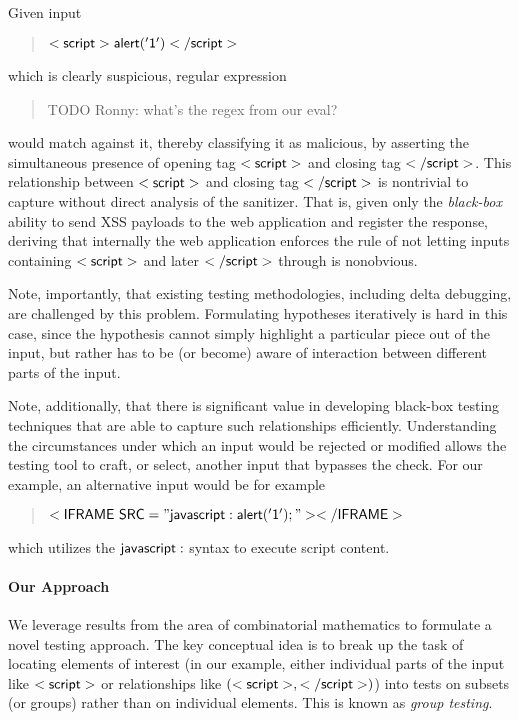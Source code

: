 Given input 
\begin{quote}
$\sf{<script>alert('1')</script>}$
\end{quote}
which is clearly suspicious, regular expression
\begin{quote}
	TODO Ronny: what's the regex from our eval?
\end{quote}
would match against it, thereby classifying it as malicious, by asserting the simultaneous presence of opening tag ${\sf <script>}$ and closing tag ${\sf </script>}$. This relationship between ${\sf <script>}$ and closing tag ${\sf </script>}$ is nontrivial to capture without direct analysis of the sanitizer. That is, given only the \emph{black-box} ability to send XSS payloads to the web application and register the response, deriving that internally the web application enforces the rule of not letting inputs containing ${\sf <script>}$ and later ${\sf </script>}$ through is nonobvious.

Note, importantly, that existing testing methodologies, including delta debugging, are challenged by this problem. Formulating hypotheses iteratively is hard in this case, since the hypothesis cannot simply highlight a particular piece out of the input, but rather has to be (or become) aware of interaction between different parts of the input.

Note, additionally, that there is significant value in developing black-box testing techniques that are able to capture such relationships efficiently. Understanding the circumstances under which an input would be rejected or modified allows the testing tool to craft, or select, another input that bypasses the check. For our example, an alternative input would be for example
\begin{quote}
	${\sf <IFRAME~SRC="javascript:alert('1');"></IFRAME>}$
\end{quote}
which utilizes the ${\sf javascript:}$ syntax to execute script content.

\paragraph{Our Approach} We leverage results from the area of combinatorial mathematics to formulate a novel testing approach. The key conceptual idea is to break up the task of locating elements of interest (in our example, either individual parts of the input like ${\sf <script>}$ or relationships like ${\sf (<script>, </script>)}$) into tests on subsets (or groups) rather than on individual elements. This is known as \emph{group testing}.

